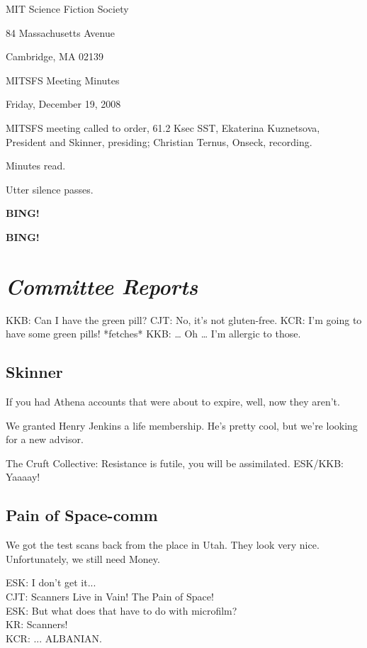 \documentclass[10pt]{article}
\newcommand{\bing}{{\bf BING!} }
\newcommand{\goto}[1]{\bing \vskip 12pt \section*{{\em{#1}}}}
\begin{document}
\begin{center}

MIT Science Fiction Society

84 Massachusetts Avenue

Cambridge, MA 02139

\vspace{12pt}

MITSFS Meeting Minutes

Friday, December 19, 2008

\end{center}

\vspace{18pt}

\setlength{\parskip}{6pt}

\noindent
MITSFS meeting called to order, 61.2 Ksec SST,
Ekaterina Kuznetsova, President and Skinner, presiding; Christian Ternus, Onseck, recording.

Minutes read.

Utter silence passes.

\bing

\goto{Committee Reports}

KKB:  Can I have the green pill?
CJT:  No, it's not gluten-free.
KCR:  I'm going to have some green pills! *fetches*
KKB:  \ldots{} Oh \ldots{} I'm allergic to those.

\subsection*{Skinner}

If you had Athena accounts that were about to expire, well, now they aren't.

We granted Henry Jenkins a life membership.  He's pretty cool, but
we're looking for a new advisor.

The Cruft Collective: Resistance is futile, you will be assimilated.
ESK/KKB: Yaaaay!

\subsection*{Pain of Space-comm}

We got the test scans back from the place in Utah.  They look very
nice.  Unfortunately, we still need Money.

ESK:  I don't get it...\\
CJT:  Scanners Live in Vain!  The Pain of Space!\\
ESK:  But what does that have to do with microfilm?\\
KR:   Scanners!\\
KCR:  ... ALBANIAN.\\
\end{document}
